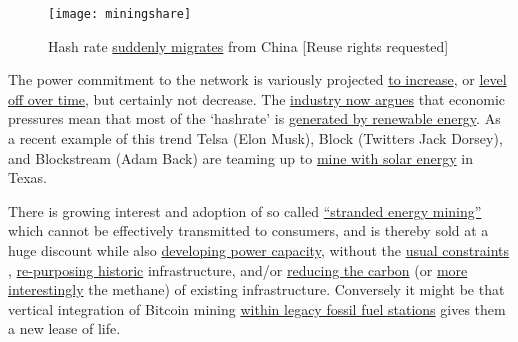 \begin{figure}
  \centering
    \texttt{[image: miningshare]}
  \caption{Hash rate \href{https://ccaf.io/cbeci/ining_map}{suddenly migrates} from China [Reuse rights requested]}
  \label{fig:miningshare}
\end{figure}
The power commitment to the network is variously projected \href{https://www.nature.com/articles/s41558-018-0321-8}{to increase}, or \href{https://assets.website-files.com/614e11526f6630959fc98679/616df63a27a7ec339f5e6a80_NYDIG-BitcoinNetZero_SML.pdf}{level off over time}, but certainly not decrease. The \href{https://www.forbes.com/sites/martinrivers/2022/04/03/is-bitcoin-really-that-bad-for-the-environment/?sh=6a3203427143}{industry now argues} that economic pressures mean that most of the `hashrate' is \href{https://bitcoinminingcouncil.com/q4-bitcoin-mining-council-survey-confirms-sustainable-power-mix-and-technological-efficiency/}{generated by renewable energy}\cite{blandin20203rd}. As a recent example of this trend Telsa (Elon Musk), Block (Twitters Jack Dorsey), and Blockstream (Adam Back) are teaming up to \href{https://www.cnbc.com/2022/04/08/tesla-block-blockstream-to-mine-bitcoin-off-solar-power-in-texas.html}{mine with solar energy} in Texas.\par 
There is growing interest and adoption of so called \href{https://www.bloomberg.com/news/articles/2022-06-01/oman-backs-u-s-firm-mining-crypto-to-cut-natural-gas-flaring}{``stranded energy mining''}  which cannot be effectively transmitted to consumers, and is thereby sold at a huge discount while also \href{https://www.renewableenergyworld.com/wind-power/900mw-wind-farm-to-power-bitcoin-mining-operation/}{developing power capacity}, without the \href{https://batcoinz.com/the-renewable-energy-cannot-happen-without-bitcoin-mining\%ef\%bf\%bc/}{usual constraints} \cite{bastian2021hedging}, \href{https://www.curbed.com/2021/07/crypto-currency-mining-old-power-plants.html}{re-purposing historic} infrastructure, and/or \href{https://www.bloomberg.com/news/articles/2022-03-24/exxon-considers-taking-gas-to-bitcoin-pilot-to-four-countries}{reducing the carbon} (or \href{https://batcoinz.com/quantifying-the-potential-impact-of-bitcoin-mining-on-global-methane-emissions-4/}{more interestingly} the methane) of existing infrastructure. Conversely it might be that vertical integration of Bitcoin mining \href{https://bitcoinmagazine.com/business/oil-companies-partner-with-bitcoin-miners}{within legacy fossil fuel stations} gives them a new lease of life.\par%
